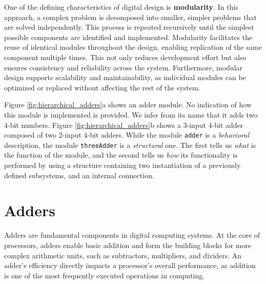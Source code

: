 One of the defining characteristics of digital design is \textbf{modularity}. In this approach, a complex problem is decomposed into smaller, simpler problems that are solved independently. This process is repeated recursively until the simplest possible components are identified and implemented. Modularity facilitates the reuse of identical modules throughout the design, enabling replication of the same component multiple times. This not only reduces development effort but also ensures consistency and reliability across the system. Furthermore, modular design supports scalability and maintainability, as individual modules can be optimized or replaced without affecting the rest of the system.


Figure \ref{fig:hierarchical_adders}a shows an adder module. No indication of how this module is implemented is provided. We infer from its name that it adds two 4-bit numbers. Figure \ref{fig:hierarchical_adders}b shows a 3-input 4-bit adder composed of two 2-input 4-bit adders. While the module {\tt adder} is a {\em behavioral} description,
the module {\tt threeAdder} is a {\em structural} one. The first
tells us {\em what} is the function of the module, and the second
tells us {\em how} its functionality is performed by using a
structure containing two instantiation of a previously defined
subsystems, and an internal connection.




\section{Adders}
Adders are fundamental components in digital computing systems. At the core of processors, adders enable basic addition and form the building blocks for more complex arithmetic units, such as subtractors, multipliers, and dividers. An adder's efficiency directly impacts a processor's overall performance, as addition is one of the most frequently executed operations in computing.

